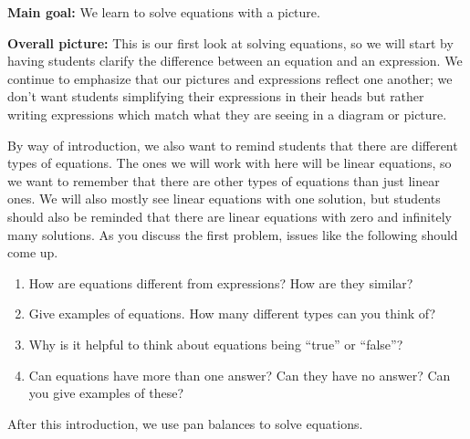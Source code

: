 \documentclass[nooutcomes,noauthor]{ximera}
\begin{document}
\begin{instructorNotes} 



{\bf Main goal:} We learn to solve equations with a picture.


{\bf Overall picture:} This is our first look at solving equations, so we will start by having students clarify the difference between an equation and an expression. We continue to emphasize that our pictures and expressions reflect one another; we don't want students simplifying their expressions in their heads but rather writing expressions which match what they are seeing in a diagram or picture.

By way of introduction, we also want to remind students that there are different types of equations. The ones we will work with here will be linear equations, so we want to remember that there are other types of equations than just linear ones. We will also mostly see linear equations with one solution, but students should also be reminded that there are linear equations with zero and infinitely many solutions. As you discuss the first problem, issues like the following should come up.
\begin{enumerate}
\item How are equations different from expressions? How are they similar?
\item Give examples of equations. How many different types can you think of?
\item Why is it helpful to think about equations being ``true'' or ``false''?
\item Can equations have more than one answer? Can they have no answer? Can you give examples of these?
\end{enumerate}	

After this introduction, we use pan balances to solve equations.



\end{instructorNotes}
\end{document}

